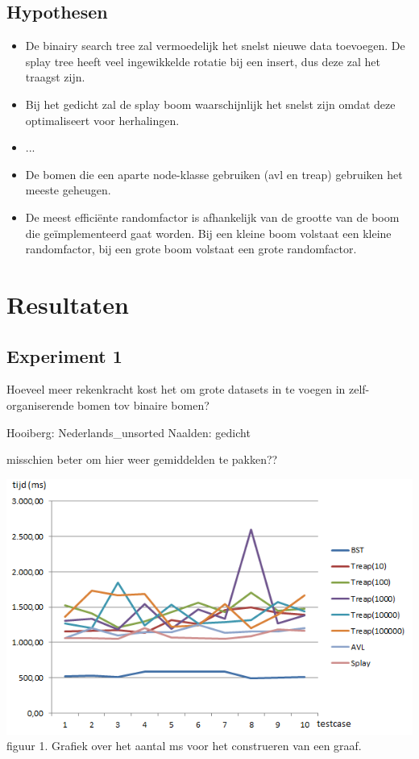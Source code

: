 \documentclass[a4paper,10pt]{article}
\begin{document}
\subsection{Hypothesen}

\begin{itemize}
\item De binairy search tree zal vermoedelijk het snelst nieuwe data toevoegen. De splay tree heeft veel ingewikkelde rotatie bij een insert, dus deze zal het traagst zijn.
\item Bij het gedicht zal de splay boom waarschijnlijk het snelst zijn omdat deze optimaliseert voor herhalingen.
\item ...
\item De bomen die een aparte node-klasse gebruiken (avl en treap) gebruiken het meeste geheugen.
\item De meest effici\"ente randomfactor is afhankelijk van de grootte van de boom die geïmplementeerd gaat worden. Bij een kleine boom volstaat een kleine randomfactor, bij een grote boom volstaat een grote randomfactor.
\end{itemize}

\section{Resultaten}

\subsection{Experiment 1}
Hoeveel meer rekenkracht kost het om grote datasets in te voegen in zelf-organiserende bomen tov binaire bomen?

Hooiberg:
Nederlands\_unsorted
Naalden:
gedicht

misschien beter om hier weer gemiddelden te pakken??

\begin{center}
\includegraphics[scale=0.75]{fill.png}
figuur 1. Grafiek over het aantal ms voor het construeren van een graaf.
\end{center}
\end{document}

